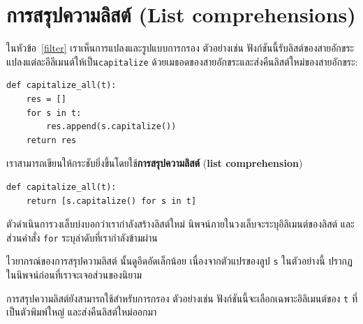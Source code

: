 \section[การสรุปความลิสต์]{การสรุปความลิสต์ (List comprehensions)} %

ในหัวข้อ~\ref{filter} เราเห็นการแปลงและรูปแบบการกรอง ตัวอย่างเช่น ฟังก์ชันนี้รับลิสต์ของสายอักขระ แปลงแต่ละอีลีเมนต์ให้เป็น{\tt capitalize} ด้วยเมธอดของสายอักขระและส่งคืนลิสต์ใหม่ของสายอักขระ:

\begin{verbatim}
def capitalize_all(t):
    res = []
    for s in t:
        res.append(s.capitalize())
    return res
\end{verbatim}

เราสามารถเขียนให้กระชับยิ่งขึ้นโดยใช้\textbf{การสรุปความลิสต์} (\textbf{list comprehension})

\begin{verbatim}
def capitalize_all(t):
    return [s.capitalize() for s in t]
\end{verbatim}

ตัวดำเนินการวงเล็บบ่งบอกว่าเรากำลังสร้างลิสต์ใหม่ นิพจน์ภายในวงเล็บจะระบุอิลิเมนต์ของลิสต์ และส่วนคำสั่ง {\tt for} ระบุลำดับที่เรากำลังข้ามผ่าน

ไวยากรณ์ของการสรุปความลิสต์ นั้นดูอึดอัดเล็กน้อย เนื่องจากตัวแปรของลูป  {\tt s} ในตัวอย่างนี้ ปรากฏในนิพจน์ก่อนที่เราจะเจอส่วนของนิยาม

การสรุปความลิสต์ยังสามารถใช้สำหรับการกรอง ตัวอย่างเช่น ฟังก์ชันนี้จะเลือกเฉพาะอิลิเมนต์ของ {\tt t} ที่เป็นตัวพิมพ์ใหญ่ และส่งคืนลิสต์ใหม่ออกมา

